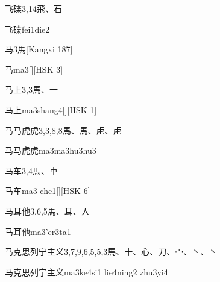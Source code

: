 \begin{Entry}{飞碟}{3,14}{⾶、⽯}
  \begin{Phonetics}{飞碟}{fei1die2}
  \end{Phonetics}
\end{Entry}

\begin{Entry}{马}{3}{⾺}[Kangxi 187]
  \begin{Phonetics}{马}{ma3}[][HSK 3]
  \end{Phonetics}
\end{Entry}

\begin{Entry}{马上}{3,3}{⾺、⼀}
  \begin{Phonetics}{马上}{ma3shang4}[][HSK 1]
  \end{Phonetics}
\end{Entry}

\begin{Entry}{马马虎虎}{3,3,8,8}{⾺、⾺、⾌、⾌}
  \begin{Phonetics}{马马虎虎}{ma3ma3hu3hu3}
  \end{Phonetics}
\end{Entry}

\begin{Entry}{马车}{3,4}{⾺、⾞}
  \begin{Phonetics}{马车}{ma3 che1}[][HSK 6]
  \end{Phonetics}
\end{Entry}

\begin{Entry}{马耳他}{3,6,5}{⾺、⽿、⼈}
  \begin{Phonetics}{马耳他}{ma3'er3ta1}
  \end{Phonetics}
\end{Entry}

\begin{Entry}{马克思列宁主义}{3,7,9,6,5,5,3}{⾺、⼗、⼼、⼑、⼧、⼂、⼂}
  \begin{Phonetics}{马克思列宁主义}{ma3ke4si1 lie4ning2 zhu3yi4}
  \end{Phonetics}
\end{Entry}

